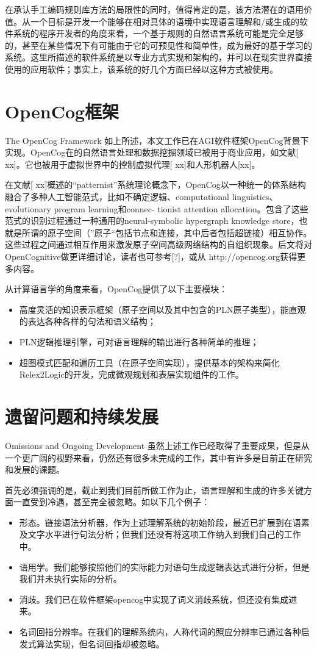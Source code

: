 在承认手工编码规则库方法的局限性的同时，值得肯定的是，该方法潜在的语用价值。从一个目标是开发一个能够在相对具体的语境中实现语言理解和/或生成的软件系统的程序开发者的角度来看，一个基于规则的自然语言系统可能是完全足够的，甚至在某些情况下有可能由于它的可预见性和简单性，成为最好的基于学习的系统。这里所描述的软件系统是以专业方式实现和架构的，并可以在现实世界直接使用的应用软件；事实上，该系统的好几个方面已经以这种方式被使用。

\section{OpenCog框架}{The OpenCog Framework}
如上所述，本文工作已在AGI软件框架OpenCog背景下实现。OpenCog在的自然语言处理和数据挖掘领域已被用于商业应用，如文献[ xx]。它也被用于虚拟世界中的控制虚拟代理[ xx]和人形机器人[xx]。

在文献[ xx]概述的“patternist”系统理论概念下，OpenCog以一种统一的体系结构融合了多种人工智能范式，比如不确定逻辑、computational linguistics、evolutionary program learning和connec- tionist attention allocation。包含了这些范式的识别过程通过一种通用的neural-symbolic hypergraph knowledge store，也就是所谓的原子空间（”原子“包括节点和连接，其中后者包括超链接）相互协作。这些过程之间通过相互作用来激发原子空间高级网络结构的自组织现象。后文将对OpenCognitive做更详细讨论，读者也可参考[?]，或从 http://opencog.org获得更多内容。

从计算语言学的角度来看，OpenCog提供了以下主要模块：
\begin{itemize}
\item 高度灵活的知识表示框架（原子空间以及其中包含的PLN原子类型），能直观的表达各种各样的句法和语义结构；
\item PLN逻辑推理引擎，可对语言理解的输出进行各种简单的推理；
\item 超图模式匹配和遍历工具（在原子空间实现），提供基本的架构来简化Relex2Logic的开发，完成微观规划和表层实现组件的工作。
\end{itemize}

\section{遗留问题和持续发展}{Omissions and Ongoing Development}
虽然上述工作已经取得了重要成果，但是从一个更广阔的视野来看，仍然还有很多未完成的工作，其中有许多是目前正在研究和发展的课题。

首先必须强调的是，截止到我们目前所做工作为止，语言理解和生成的许多关键方面一直受到冷遇，甚至完全被忽略。如以下几个例子：
\begin{itemize}
\item 形态。链接语法分析器，作为上述理解系统的初始阶段，最近已扩展到在语素及文字水平进行句法分析；但我们还没有将这项工作纳入到我们自己的工作中。
\item 语用学。我们能够按照他们的实际能力对语句生成逻辑表达式进行分析，但是我们并未执行实际的分析。
\item 消歧。我们已在软件框架opencog中实现了词义消歧系统，但还没有集成进来。
\item 名词回指分辨率。在我们的理解系统内，人称代词的照应分辨率已通过各种启发式算法实现，但名词回指却被忽略。
\end{itemize}

